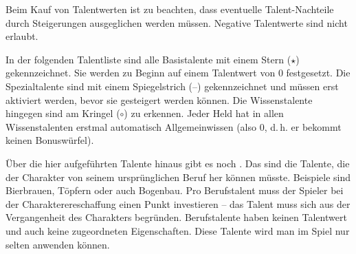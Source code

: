  Beim Kauf von Talentwerten ist zu beachten, dass eventuelle Talent-Nachteile durch Steigerungen ausgeglichen werden müssen. Negative Talentwerte sind nicht erlaubt.

In der folgenden Talentliste sind alle Basistalente mit einem Stern ($\star$) gekennzeichnet. Sie werden zu Beginn auf einem Talentwert von $0$ festgesetzt. Die Spezialtalente sind mit einem Spiegelstrich (--) gekennzeichnet und müssen erst aktiviert werden, bevor sie gesteigert werden können. Die Wissenstalente hingegen sind am Kringel ($\circ$) zu erkennen. Jeder Held hat in allen Wissenstalenten erstmal automatisch Allgemeinwissen (also $0$, d.\,h. er bekommt keinen Bonuswürfel).

Über die hier aufgeführten Talente hinaus gibt es noch . Das sind die Talente, die der Charakter von seinem ursprünglichen Beruf her können müsste. Beispiele sind Bierbrauen, Töpfern oder auch Bogenbau. Pro Berufstalent muss der Spieler bei der Charakterereschaffung einen Punkt investieren -- das Talent muss sich aus der Vergangenheit des Charakters begründen. Berufstalente haben keinen Talentwert und auch keine zugeordneten Eigenschaften. Diese Talente wird man im Spiel nur selten anwenden können.

